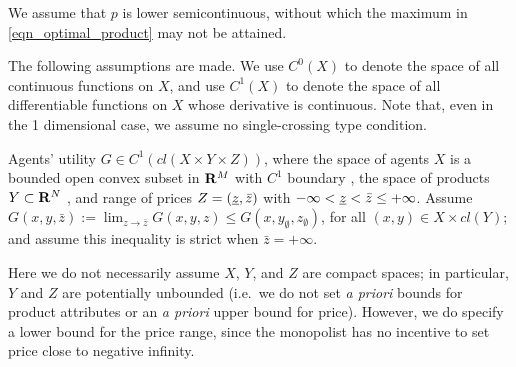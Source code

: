 We assume that $p$ is lower semicontinuous, without which the maximum in \eqref{eqn_optimal_product} may not be attained. %
\medskip


The following assumptions are made. {We use $C^0(X)$ to denote the space of all continuous functions on $X$, and use $C^1(X)$ to denote the space of all differentiable functions on $X$ whose derivative is continuous.} Note that, even in the 1 dimensional case, we assume no single-crossing type condition.\medskip%




\begin{assumption}\label{assmp:Gregular}
	Agents' utility $G \in C^{1}(cl(X\times Y \times Z))$, where the space of agents $X$ is a bounded open convex subset in ${\mathbf R}^M$ with $C^1$ boundary%
	, the space of products $Y \subset {\mathbf R}^N$%
	, and range of prices $Z=(\munderbar z,\bar z)$ with $-\infty < \munderbar z < \bar z \le +\infty$. {Assume $G(x,y,\bar{z}) := \lim_{z\longrightarrow \bar{z}} G(x,y,z) \le G(x, y_{\emptyset}, z_{\emptyset})$, for all $(x,y) \in X \times cl(Y)$; and assume this inequality is strict when $\bar{z} = +\infty$.}
\end{assumption}



Here we do not necessarily assume $X$, $Y$, and $Z$ are compact spaces; in particular, $Y$ and $Z$ are potentially unbounded %
(i.e.\ we do not set  \textit{a priori} bounds for product attributes or an \textit{a priori} upper bound for price). However, we do specify a lower bound for the price range, since the monopolist has no incentive to set price close to negative infinity. %
\medskip



